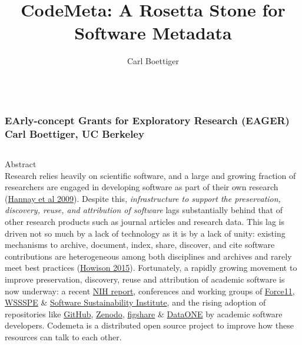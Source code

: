 \documentclass[final,hyperref={pdfpagelabels=false},xcolor=svgnames]{beamer}
\title[]{\VeryHuge \textbf{ CodeMeta: A Rosetta Stone for Software Metadata }}
\author{Carl Boettiger}
\institute{Environmental Science, Policy, and Management, University of California, Berkeley}
\begin{document}
  \begin{frame}[t,fragile] 

          \frametitle{\\
          \LARGE{\hspace{1cm} EArly-concept Grants for Exploratory Research (EAGER) \\
          \hspace{1cm} Carl Boettiger, UC Berkeley}}
\vspace{3cm}


\begin{columns}[t] %
  \begin{column}{.30\paperwidth}
 
        {\LARGE Abstract } \\
  
        Research relies heavily on scientific software, and a large and growing
        fraction of researchers are engaged in developing software as part of
        their own research
        (\href{http://dx.doi.org/10.1109/SECSE.2009.5069155}{Hannay et al 2009}).
        Despite this, \emph{infrastructure to support the preservation,
        discovery, reuse, and attribution of software} lags substantially behind
        that of other research products such as journal articles and research
        data. This lag is driven not so much by a lack of technology as it is by
        a lack of unity: existing mechanisms to archive, document, index, share,
        discover, and cite software contributions are heterogeneous among both
        disciplines and archives and rarely meet best practices
        (\href{http://dx.doi.org/10.1002/asi.23538}{Howison 2015}).
        Fortunately, a rapidly growing movement to improve preservation,
        discovery, reuse and attribution of academic software is now underway: a
        recent \href{http://softwarediscoveryindex.org}{NIH report}, conferences
        and working groups of \href{https://www.force11.org/}{Force11},
        \href{http://wssspe.researchcomputing.org.uk/}{WSSSPE} \&
        \href{http://www.software.ac.uk/}{Software Sustainability Institute},
        and the rising adoption of repositories like
        \href{https://github.com}{GitHub}, \href{https://zenodo.org}{Zenodo},
        \href{https://figshare.com}{figshare} \&
        \href{https://www.dataone.org}{DataONE} by academic software developers.
        Codemeta is a distributed open source project to improve how these resources
        can talk to each other.\\
        

\end{column}
\end{columns}
\end{frame}
\end{document}
